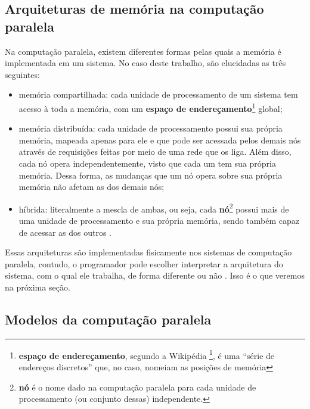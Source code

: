     \subsection{Arquiteturas de memória na computação paralela}
    
	    \label{subsec:memory-architectures}
	    
	    Na computação paralela, existem diferentes formas pelas quais a 
	    memória é implementada em um sistema. No caso deste trabalho, são
	    elucidadas as três seguintes:
        \begin{itemize}
            \item memória compartilhada: cada unidade de processamento de
            um sistema tem acesso à toda a memória, com um \textbf{espaço de
            endereçamento}\footnote{\textbf{espaço de endereçamento}, segundo
            a Wikipédia \footcite{wiki:address}, é uma ``série de endereços
            discretos'' que, no caso, nomeiam as posições de memória} global;
            
            \item memória distribuída: cada unidade de processamento possui
            sua própria memória, mapeada apenas para ele e que pode ser 
            acessada pelos demais nós através de requisições feitas por meio
            de uma rede que os liga. Além disso, cada nó opera
            independentemente, visto que cada um tem sua própria memória.
            Dessa forma, as mudanças que um nó opera sobre sua própria 
            memória não afetam as dos demais nós;
            
            \item híbrida: literalmente a mescla de ambas, ou seja, cada 
            \textbf{nó}\footnote{\textbf{nó} é o nome dado na computação 
            paralela para cada unidade de processamento (ou conjunto dessas) 
            independente.} possui mais de uma unidade de processamento e sua 
	        própria memória, sendo também capaz de acessar as dos outros 
	        \cite{LLNL:parcomp}.
        \end{itemize}
        
        Essas arquiteturas são implementadas fisicamente nos sistemas de 
        computação paralela, contudo, o programador pode escolher interpretar 
        a arquitetura do sistema, com o qual ele trabalha, de forma diferente
        ou não \cite{LLNL:parcomp}. Isso é o que veremos na próxima seção.
    
    \subsection{Modelos da computação paralela}
    

